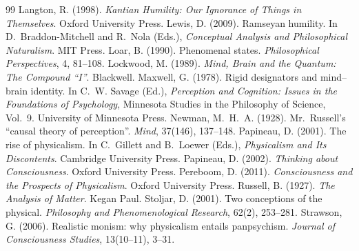\documentclass{situationist-preprint}
\begin{document}
\begin{thebibliography}{99}
 Langton, R. (1998). \emph{Kantian Humility: Our Ignorance of Things in Themselves}. Oxford University Press.
 Lewis, D. (2009). Ramseyan humility. In D.~Braddon-Mitchell and R.~Nola (Eds.), \emph{Conceptual Analysis and Philosophical Naturalism}. MIT Press.
 Loar, B. (1990). Phenomenal states. \emph{Philosophical Perspectives}, 4, 81--108.
 Lockwood, M. (1989). \emph{Mind, Brain and the Quantum: The Compound \enquote{I}}. Blackwell.
 Maxwell, G. (1978). Rigid designators and mind--brain identity. In C.~W. Savage (Ed.), \emph{Perception and Cognition: Issues in the Foundations of Psychology}, Minnesota Studies in the Philosophy of Science, Vol.~9. University of Minnesota Press.
 Newman, M.~H.~A. (1928). Mr.\ Russell's \enquote{causal theory of perception}. \emph{Mind}, 37(146), 137--148.
 Papineau, D. (2001). The rise of physicalism. In C.~Gillett and B.~Loewer (Eds.), \emph{Physicalism and Its Discontents}. Cambridge University Press.
 Papineau, D. (2002). \emph{Thinking about Consciousness}. Oxford University Press.
 Pereboom, D. (2011). \emph{Consciousness and the Prospects of Physicalism}. Oxford University Press.
 Russell, B. (1927). \emph{The Analysis of Matter}. Kegan Paul.
 Stoljar, D. (2001). Two conceptions of the physical. \emph{Philosophy and Phenomenological Research}, 62(2), 253--281.
 Strawson, G. (2006). Realistic monism: why physicalism entails panpsychism. \emph{Journal of Consciousness Studies}, 13(10--11), 3--31.
\end{thebibliography}
\end{document}
